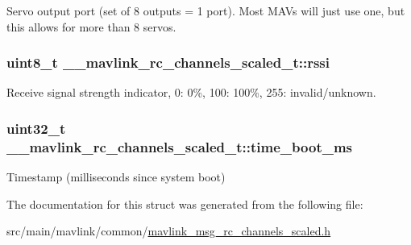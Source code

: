 Servo output port (set of 8 outputs = 1 port). Most M\+A\+Vs will just use one, but this allows for more than 8 servos. 

\hypertarget{struct____mavlink__rc__channels__scaled__t_a06ada0758b5f85258d48fd19ebe7a5bd}{
\subsubsection[{rssi}]{\setlength{\rightskip}{0pt plus 5cm}uint8\+\_\+t \+\_\+\+\_\+mavlink\+\_\+rc\+\_\+channels\+\_\+scaled\+\_\+t\+::rssi}}\label{struct____mavlink__rc__channels__scaled__t_a06ada0758b5f85258d48fd19ebe7a5bd}


Receive signal strength indicator, 0\+: 0\%, 100\+: 100\%, 255\+: invalid/unknown. 

\hypertarget{struct____mavlink__rc__channels__scaled__t_ae035a89efbc6107932416a1a65268bfe}{
\subsubsection[{time\+\_\+boot\+\_\+ms}]{\setlength{\rightskip}{0pt plus 5cm}uint32\+\_\+t \+\_\+\+\_\+mavlink\+\_\+rc\+\_\+channels\+\_\+scaled\+\_\+t\+::time\+\_\+boot\+\_\+ms}}\label{struct____mavlink__rc__channels__scaled__t_ae035a89efbc6107932416a1a65268bfe}


Timestamp (milliseconds since system boot) 



The documentation for this struct was generated from the following file\+:\begin{DoxyCompactItemize}
\item 
src/main/mavlink/common/\hyperlink{mavlink__msg__rc__channels__scaled_8h}{mavlink\+\_\+msg\+\_\+rc\+\_\+channels\+\_\+scaled.\+h}\end{DoxyCompactItemize}
